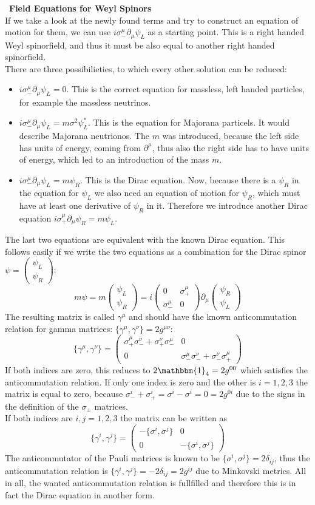 \documentclass{include/thesisclass}
\newcommand{\ehm}{\mathbbm{1}}
\newcommand{\p}{\partial}
\newcommand{\vektorz}[2]{\begin{pmatrix} #1 \\ #2 \end{pmatrix}}
\newcommand{\Matz}[4]{\begin{pmatrix}#1&#2\\#3&#4\end{pmatrix}}
\newcommand{\sub}[1]{~\newline\newline\textbf{#1}\\}
\begin{document}
\sub{Field Equations for Weyl Spinors}
If we take a look at the newly found terms and try to construct an equation of motion for them, we can use $i \sigma_-^\mu\p_\mu \psi_L$ as a starting point. This is a right handed Weyl spinorfield, and thus it must be also equal to another right handed spinorfield.\\
There are three possibilieties, to which every other solution can be reduced:
\begin{itemize}
\item $i \sigma_-^\mu \p_\mu \psi_L = 0$. This is the correct equation for massless, left handed particles, for example the massless neutrinos.
\item $i \sigma_-^\mu \p_\mu \psi_L = m \sigma^2 \psi_L^*$. This is the equation for Majorana particels. It would describe Majorana neutrionos. The $m$ was introduced, because the left side has units of energy, coming from $\p^\mu$, thus also the right side has to have units of energy, which led to an introduction of the mass $m$.
\item $i \sigma_-^\mu \p_\mu \psi_L = m \psi_R$. This is the Dirac equation. Now, because there is a $\psi_R$ in the equation for $\psi_L$ we also need an equation of motion for $\psi_R$, which must have at least one derivative of $\psi_R$ in it. Therefore we introduce another Dirac equation $i \sigma_+^\mu \p_\mu \psi_R = m \psi_L$.
\end{itemize}
The last two equations are equivalent with the known Dirac equation. This follows easily if we write the two equations as a combination for the Dirac spinor $\psi = \vektorz{\psi_L}{\psi_R}$:
\[ m \psi = m \vektorz{\psi_L}{\psi_R} = i \Matz{0}{\sigma_+^\mu}{\sigma_-^\mu}{0} \p_\mu\vektorz{\psi_R}{\psi_L}\]
The resulting matrix is called $\gamma^\mu$ and should have the known anticommutation relation for gamma matrices: $\{\gamma^\mu, \gamma^\nu\} = 2g^{\mu\nu}$:
\[\{\gamma^\mu, \gamma^\nu\} = \Matz{\sigma_+^\mu\sigma_-^\nu + \sigma_+^\nu\sigma_-^\mu}{0}{0}{\sigma_-^\mu\sigma_-^\nu+ \sigma_-^\nu\sigma_+^\mu}\]
If both indices are zero, this reduces to $2\ehm_4 = 2 g^{00}$ which satisfies the anticommutation relation. If only one index is zero and the other is $i = 1,2,3$ the matrix is equal to zero, because $\sigma_-^i + \sigma_+^i = \sigma^i - \sigma^i = 0 = 2 g^{0i}$ due to the signs in the definition of the $\sigma_\pm$ matrices. \\
If both indices are $i,j = 1,2,3$ the matrix can be written as 
\[ \{\gamma^i,\gamma^j\} = \Matz{-\{\sigma^i,\sigma^j\}}{0}{0}{-\{\sigma^i,\sigma^j\}}\]
The anticommutator of the Pauli matrices is known to be $\{\sigma^i, \sigma^j\} = 2\delta_{ij}$, thus the anticommutation relation is $\{\gamma^i,\gamma^j\} = - 2\delta_{ij} = 2 g^{ij}$ due to Minkovski metrics. All in all, the wanted anticommutation relation is fullfilled and therefore this is in fact the Dirac equation in another form.
\end{document}
